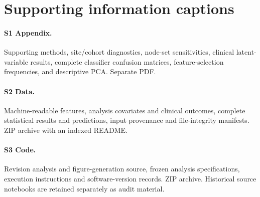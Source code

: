 \documentclass[10pt,letterpaper]{article}
\begin{document}
\nolinenumbers


\section*{Supporting information captions}
\paragraph{S1 Appendix.} Supporting methods, site/cohort diagnostics, node-set
sensitivities, clinical latent-variable results, complete classifier confusion
matrices, feature-selection frequencies, and descriptive PCA. Separate PDF.
\paragraph{S2 Data.} Machine-readable features, analysis covariates and clinical
outcomes, complete statistical results and predictions, input provenance and
file-integrity manifests. ZIP archive with an indexed README.
\paragraph{S3 Code.} Revision analysis and figure-generation source, frozen
analysis specifications, execution instructions and software-version records.
ZIP archive. Historical source notebooks are retained separately as audit material.
\end{document}
